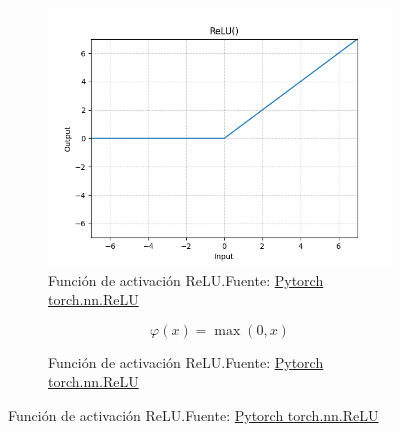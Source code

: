 \begin{figure}[H]
    \centering
    \captionsetup{justification=centering}

    \begin{subfigure}{.475\linewidth}
        \centering
        \includegraphics[width=0.75\linewidth]{figures/equations/ReLU.png}
        \caption{Función de activación ReLU.\newline{}Fuente: \href{https://pytorch.org/docs/stable/generated/torch.nn.ReLU.html}{Pytorch torch.nn.ReLU}}
        \label{subfig:torch.nn.ReLU}
    \end{subfigure}\hfill %
    \begin{subfigure}{.475\linewidth}
        \centering
        \begin{equation*}\varphi(x) = \operatorname*{max}(0,x)\end{equation*}
        \caption{Función de activación ReLU.\newline{}Fuente: \href{https://pytorch.org/docs/stable/generated/torch.nn.ReLU.html}{Pytorch torch.nn.ReLU}}
        \label{subfig:eq-torch.nn.ReLU}
    \end{subfigure}


\end{figure}
